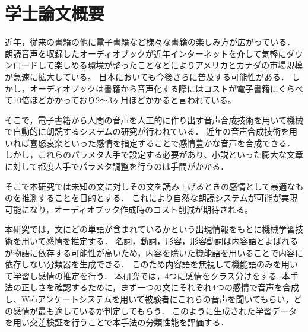 \chapter*{学士論文概要}

近年，従来の書籍の他に電子書籍など様々な書籍の楽しみ方が広がっている．
朗読音声を収録したオーディオブックが近年インターネットを介して気軽にダウンロードして楽しめる環境が整ったことなどによりアメリカとカナダの市場規模が急速に拡大している。
日本においても今後さらに普及する可能性がある．
しかし，オーディオブックは書籍から音声化する際にはコストが電子書籍にくらべて10倍ほどかかっており2〜3ヶ月ほどかかると言われている。

そこで，電子書籍から人間の音声を人工的に作り出す音声合成技術を用いて機械で自動的に朗読するシステムの研究が行われている．
近年の音声合成技術を用いれば喜怒哀楽といった感情を指定することで感情豊かな音声を合成できる．
しかし，これらのパラメタ人手で設定する必要があり、小説といった膨大な文章に対して都度人手でパラメタ調整を行うのは手間がかかる．

そこで本研究では未知の文に対しその文を読み上げるときの感情として最適なものを推測することを目的とする．
これにより自然な朗読システムが可能が実現可能になり，オーディオブック作成時のコスト削減が期待される。

本研究では，文にどの単語が含まれているかという出現情報をもとに機械学習技術を用いて感情を推定する．
名詞，動詞，形容，形容動詞は内容語とよばれるが物語に依存する可能性が高いため，内容を除いた機能語を用いることで内容に依存しない分類器を生成できる．
このため内容語を無視して機能語のみを用いて学習し感情の推定を行う．
本研究では，4つに感情をクラス分けをする.
本手法の正しさを確認するために，まず一つの文にそれぞれ4つの感情で音声を合成し、Webアンケートシステムを用いて被験者にこれらの音声を聞いてもらい，どの感情が最も適しているか判定してもらう．
このように生成された学習データを用い交差検証を行うことで本手法の分類性能を評価する．
